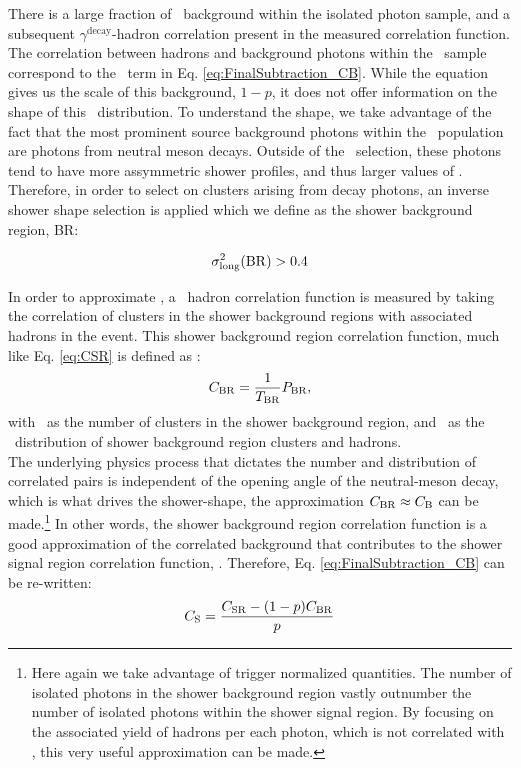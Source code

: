 There is a large fraction of \ydecay~background within the isolated photon sample, and a subsequent $\gamma^\mathrm{decay}$-hadron correlation present in the measured correlation function. The correlation between hadrons and background photons within the \gammaiso~sample correspond to the \CB~term in Eq. \ref{eq:FinalSubtraction_CB}. While the equation gives us the scale of this background, $1-p$, it does not offer information on the shape of this \deltaphi~distribution. To understand the shape, we take advantage of the fact that the most prominent source background photons within the \gammaiso~population are photons from neutral meson decays. Outside of the \gammaiso~selection, these photons tend to have more assymmetric shower profiles, and thus larger values of \lambdasquare. Therefore, in order to select on clusters arising from decay photons, an inverse shower shape selection is applied which we define as the shower background region, BR:

\begin{equation}
  \label{eq:BR}
  \sigma^{2}_{\mathrm{long}}(\mathrm{BR}) > 0.4
\end{equation}

In order to approximate \CB, a \ydecay~hadron correlation function is measured by taking the correlation of clusters in the shower background regions with associated hadrons in the event. This shower background region correlation function, much like Eq. \ref{eq:CSR} is defined as \CBR:
\begin{equation}
  C_{\mathrm{BR}} = \frac{1}{T_{\mathrm{BR}}}P_{\mathrm{BR}},
\end{equation}
with \TBR~as the number of clusters in the shower background region, and \PBR~as the \deltaphi~distribution of shower background region clusters and hadrons.\\

The underlying physics process that dictates the number and distribution of correlated pairs is independent of the opening angle of the neutral-meson decay, which is what drives the shower-shape, the approximation $C_{\mathrm{BR}} \approx C_{\mathrm{B}}$ can be made.\footnote{Here again we take advantage of trigger normalized quantities. The number of isolated photons in the shower background region vastly outnumber the number of isolated photons within the shower signal region. By focusing on the associated yield of hadrons per each photon, which is not correlated with \lambdasquare, this very useful approximation can be made.} In other words, the shower background region correlation function is a good approximation of the correlated background that contributes to the shower signal region correlation function, \CSR. Therefore, Eq. \ref{eq:FinalSubtraction_CB} can be re-written:
\begin{equation}
  C_{\mathrm{S}} = \frac{C_{\mathrm{SR}} - (1-p) C_{\mathrm{BR}}}{p}
  \label{eq:FinalSubtraction}
\end{equation}

